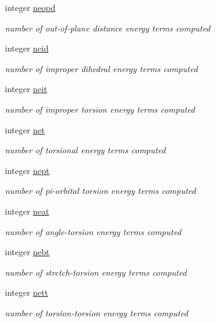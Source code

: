 \begin{DoxyCompactItemize}
integer \hyperlink{classaction_a783f4acdf51b44b4acfb9ce9222ea628}{neopd}
\begin{DoxyCompactList}\small\item\em number of out-\/of-\/plane distance energy terms computed \end{DoxyCompactList}\item 
integer \hyperlink{classaction_a948e8253badc8aa179fdbccc1fbb6be7}{neid}
\begin{DoxyCompactList}\small\item\em number of improper dihedral energy terms computed \end{DoxyCompactList}\item 
integer \hyperlink{classaction_a998c2a3a95f52e1c3250517858642607}{neit}
\begin{DoxyCompactList}\small\item\em number of improper torsion energy terms computed \end{DoxyCompactList}\item 
integer \hyperlink{classaction_ae190d5331cec91c8023bbab730b28cb5}{net}
\begin{DoxyCompactList}\small\item\em number of torsional energy terms computed \end{DoxyCompactList}\item 
integer \hyperlink{classaction_a6fd320a2f65ee54d671119c638e1c85e}{nept}
\begin{DoxyCompactList}\small\item\em number of pi-\/orbital torsion energy terms computed \end{DoxyCompactList}\item 
integer \hyperlink{classaction_abe35a8a2f1663f0e0be7ddf1567e41ad}{neat}
\begin{DoxyCompactList}\small\item\em number of angle-\/torsion energy terms computed \end{DoxyCompactList}\item 
integer \hyperlink{classaction_a4fd1cbddf403ce7ee2d02f6038bd9332}{nebt}
\begin{DoxyCompactList}\small\item\em number of stretch-\/torsion energy terms computed \end{DoxyCompactList}\item 
integer \hyperlink{classaction_a6ea92e5fa1353b0cf4e0220644a28fcf}{nett}
\begin{DoxyCompactList}\small\item\em number of torsion-\/torsion energy terms computed \end{DoxyCompactList}\item 

\end{DoxyCompactItemize}
